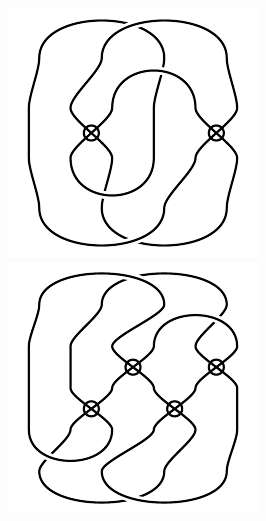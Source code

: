 \begin{figure}[H]
\begin{minipage}[b]{.18\linewidth}
\end{minipage}
\begin{minipage}[b]{.18\linewidth}
\centering
\includegraphics[width=\linewidth]{../data/virtual_4_69.png}
\end{minipage}
\begin{minipage}[b]{.18\linewidth}
\centering
\includegraphics[width=\linewidth]{../data/virtual_4_70.png}

\end{minipage}
\end{figure}
